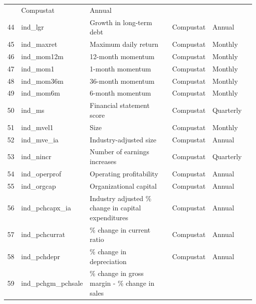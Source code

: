 \documentclass[a4paper, table]{article}
\begin{document}
\begin{landscape}
\begin{center}
\begin{longtable}{lllllll}
				\cite{bhandari_debt/equity_1988} & Compustat & Annual \\
			44 & ind\_lgr & Growth in long-term debt & 
				\cite{richardson_accrual_2005} & Compustat & Annual \\
			45 & ind\_maxret & Maximum daily return & 
				\cite{bali_maxing_2011} & Compustat & Monthly \\
			46 & ind\_mom12m & 12-month momentum & 
				\cite{jegadeesh_evidence_1990} & Compustat & Monthly \\
			47 & ind\_mom1 & 1-month momentum & 
				\cite{jegadeesh_returns_1993} & Compustat & Monthly \\
			48 & ind\_mom36m\footnotemark[\value{footnote}] & 36-month momentum & 
				\cite{jegadeesh_returns_1993} & Compustat & Monthly \\
			49 & ind\_mom6m & 6-month momentum & 
				\cite{jegadeesh_returns_1993} & Compustat & Monthly \\
			50 & ind\_ms & Financial statement score & 
				\cite{mohanram_separating_2005} & Compustat & Quarterly \\
			51 & ind\_mvel1 & Size & 
				\cite{banz_relationship_1981} & Compustat & Monthly \\
			52 & ind\_mve\_ia & Industry-adjusted size & 
				\cite{asness_predicting_2000} & Compustat & Annual \\
			53 & ind\_nincr & Number of earnings increases & 
				\cite{barth_market_1999} & Compustat & Quarterly \\
			54 & ind\_operprof\footnotemark[\value{footnote}] & Operating profitability & 
				\cite{fama_five-factor_2015} & Compustat & Annual \\
			55 & ind\_orgcap\footnotemark[\value{footnote}] & Organizational capital & 
				\cite{eisfeldt_organization_2013} & Compustat & Annual \\
			56 & ind\_pchcapx\_ia\footnotemark[\value{footnote}] & Industry adjusted \% change in capital expenditures & 
				\cite{abarbanell_abnormal_1998} & Compustat & Annual \\
			57 & ind\_pchcurrat\footnotemark[\value{footnote}] & \% change in current ratio & 
				\cite{ou_financial_1989} & Compustat & Annual \\
			58 & ind\_pchdepr\footnotemark[\value{footnote}] & \% change in depreciation & 
				\cite{holthausen_prediction_1992} & Compustat & Annual \\
			59 & ind\_pchgm\_pchsale\footnotemark[\value{footnote}] & \% change in gross margin - \% change in sales & 

\end{longtable}
\end{center}
\end{landscape}
\end{document}

